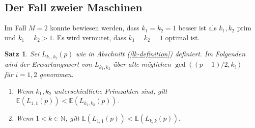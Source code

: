 \documentclass[a4paper, 10pt, ngerman]{article}
\newcommand{\E}{\mathbb{E}}
\newcommand{\N}{\mathbb{N}}
\newtheorem{theorem}{Satz}
\begin{document}
\subsection{Der Fall zweier Maschinen}

Im Fall $M = 2$ konnte bewiesen werden, dass $k_1 = k_2 = 1$ besser ist als $k_1, k_2$ prim und $k_1 = k_2 > 1$. Es wird vermutet, dass $k_1 = k_2 = 1$ optimal ist.

\begin{theorem}
    \label{theorem:optimal-k-m2}
    Sei $L_{k_1, k_2}(p)$ wie in Abschnitt (\ref{lk-definition}) definiert. Im Folgenden wird der Erwartungswert von $L_{k_1, k_2}$ über alle möglichen $\gcd((p - 1)/2, k_i)$ für $i = 1, 2$ genommen.
    \begin{enumerate}
        \item Wenn $k_1, k_2$ unterschiedliche Primzahlen sind, gilt $\E(L_{1, 1}(p)) < \E(L_{k_1, k_2}(p))$.
        \item Wenn $1 < k \in \N$, gilt $\E(L_{1, 1}(p)) < \E(L_{k, k}(p))$.
    \end{enumerate}
\end{theorem}
\end{document}
